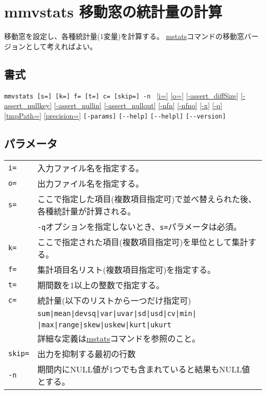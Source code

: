 
%

\section{mmvstats 移動窓の統計量の計算\label{sect:mmvstats}}

移動窓を設定し、各種統計量(1変量)を計算する。
\hyperref[sect:mstats]{mstats}コマンドの移動窓バージョンとして考えればよい。

\subsection*{書式}
\verb|mmvstats [s=] [k=] f= [t=] c= [skip=] -n |
\hyperref[sect:option_i]{[i=]}
\hyperref[sect:option_o]{[o=]}
\hyperref[sect:option_assert_diffSize]{[-assert\_diffSize]}
\hyperref[sect:option_assert_nullkey]{[-assert\_nullkey]}
\hyperref[sect:option_assert_nullin]{[-assert\_nullin]}
\hyperref[sect:option_assert_nullout]{[-assert\_nullout]}
\hyperref[sect:option_nfn]{[-nfn]} 
\hyperref[sect:option_nfno]{[-nfno]}  
\hyperref[sect:option_x]{[-x]}
\hyperref[sect:option_q]{[-q]}
\hyperref[sect:option_option_tmppath]{[tmpPath=]}
\hyperref[sect:option_precision]{[precision=]}
\verb|[-params]|
\verb|[--help]|
\verb|[--helpl]|
\verb|[--version]|\\

\subsection*{パラメータ}
\begin{table}[htbp]
{\small
\begin{tabular}{ll}
\verb|i=|    & 入力ファイル名を指定する。\\
\verb|o=|    & 出力ファイル名を指定する。\\
\verb|s=|    & ここで指定した項目(複数項目指定可)で並べ替えられた後、各種統計量が計算される。\\
             & \verb|-q|オプションを指定しないとき、\verb|s=|パラメータは必須。\\
\verb|k=|    & ここで指定された項目(複数項目指定可)を単位として集計する。\\
\verb|f=|    & 集計項目名リスト(複数項目指定可)を指定する。\\
\verb|t=|    & 期間数を1以上の整数で指定する。 \\
\verb|c=|    & 統計量(以下のリストから一つだけ指定可)\\
             & \verb/sum|mean|devsq|var|uvar|sd|usd|cv|min|/\\
             & \verb/|max|range|skew|uskew|kurt|ukurt/\\
             & 詳細な定義は\hyperref[sect:mstats]{mstats}コマンドを参照のこと。\\
\verb|skip=| & 出力を抑制する最初の行数\\
\verb|-n| & 期間内にNULL値が1つでも含まれていると結果もNULL値とする。\\
\end{tabular} 
}
\end{table} 


